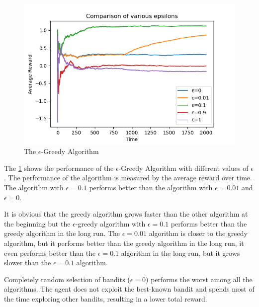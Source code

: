 \begin{figure}[h!]
    \centering
    \includegraphics[width=0.75\linewidth]{images/compare-epsilon-greedy.png}
    \caption{The $\epsilon$-Greedy Algorithm}
    \label{fig:epsilon_greedy}
\end{figure}

The \ref{fig:epsilon_greedy} shows the performance of the $\epsilon$-Greedy Algorithm with different values of $\epsilon$. The performance of the algorithm is measured by the average reward over time. The algorithm with $\epsilon=0.1$ performs better than the algorithm with $\epsilon=0.01$ and $\epsilon=0$.

It is obvious that the greedy algorithm grows faster than the other algorithm at the beginning but the $\epsilon$-greedy algorithm with $\epsilon=0.1$ performs better than the greedy algorithm in the long run. The $\epsilon=0.01$ algorithm is closer to the greedy algorithm, but it performs better than the greedy algorithm in the long run, it even performs better than the $\epsilon=0.1$ algorithm in the long run, but it grows slower than the $\epsilon=0.1$ algorithm.

Completely random selection of bandits ($\epsilon=0$) performs the worst among all the algorithms. The agent does not exploit the best-known bandit and spends most of the time exploring other bandits, resulting in a lower total reward.

